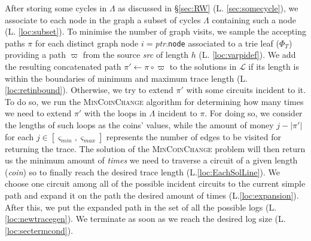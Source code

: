 \documentclass[sigconf]{acmart}
\newcommand{\smin}{\ensuremath{\varsigma_\textit{min}}}
\newcommand{\smax}{\ensuremath{\varsigma_\textit{max}}}
\begin{document}
After storing some cycles in $\Lambda$ as discussed in \S\ref{sec:RW} (L. \ref{sec:somecycle}), we associate to each node in the graph a subset of cycles $\Lambda$ containing such a node (L. \ref{loc:subset}). To minimise the number of graph visits, we sample the accepting paths $\pi$ for each distinct graph node $i=$\textit{ptr}.\texttt{node} associated to a trie leaf ($\Phi_T$) providing a path $\varpi$ from the source \textit{src} of length $h$ (L. \ref{loc:varpidef}). We add the resulting  concatenated path $\pi'\gets\pi\circ\varpi$ to the solutions in $\mathcal{L}$ if its length is within the boundaries of minimum and maximum trace length (L. \ref{loc:retinbound}). Otherwise, we try to extend $\pi'$ with some circuits incident to it. To do so, we run the \textsc{MinCoinChange} algorithm for determining how many times we need to extend $\pi'$ with the loops in $\Lambda$ incident to $\pi$. For doing so, we consider the lengths of such loops as the coins' values, while the amount of money $j-|\pi'|$  for each $j\in [\smin,\smax]$ represents the number of edges to be visited for returning the trace. The solution of the \textsc{MinCoinChange} problem will then return us the minimum amount of \textit{times} we need to traverse a circuit of a given length (\textit{coin}) so to finally reach the desired trace length (L.\ref{loc:EachSolLine}). We choose one circuit among all of the possible incident circuits to the current simple path and expand it on the path the desired amount of times (L.\ref{loc:expansion}). After this, we put the expanded path in the set of all the possible logs (L.\ref{loc:newtracegen}). We terminate as soon as we reach the desired log size (L.\ref{loc:sectermcond}).

 
\end{document}
